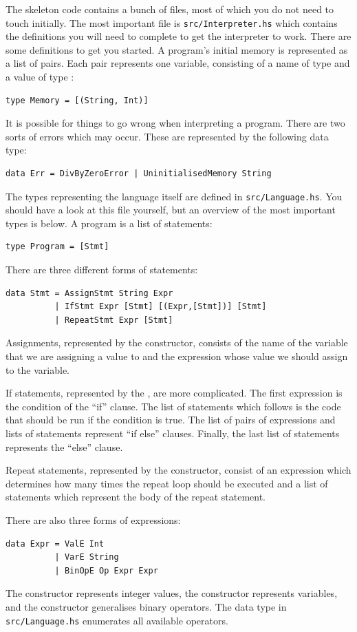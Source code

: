 The skeleton code contains a bunch of files, most of which you do not need to touch initially. The most important file is \texttt{\small src/Interpreter.hs} which contains the definitions you will need to complete to get the interpreter to work. There are some definitions to get you started. A program's initial memory is represented as a list of pairs. Each pair represents one variable, consisting of a name of type  and a value of type :
\begin{verbatim}
type Memory = [(String, Int)]
\end{verbatim}
It is possible for things to go wrong when interpreting a program. There are two sorts of errors which may occur. These are represented by the following data type:
\begin{verbatim}
data Err = DivByZeroError | UninitialisedMemory String
\end{verbatim}
The types representing the language itself are defined in \texttt{\small src/Language.hs}. You should have a look at this file yourself, but an overview of the most important types is below. A program is a list of statements:
\begin{verbatim}
type Program = [Stmt]
\end{verbatim}
There are three different forms of statements: 
\begin{verbatim}
data Stmt = AssignStmt String Expr
          | IfStmt Expr [Stmt] [(Expr,[Stmt])] [Stmt]
          | RepeatStmt Expr [Stmt]
\end{verbatim}
Assignments, represented by the  constructor, consists of the name of the variable that we are assigning a value to and the expression whose value we should assign to the variable. 

If statements, represented by the , are more complicated. The first expression is the condition of the ``if'' clause. The list of statements which follows is the code that should be run if the condition is true. The list of pairs of expressions and lists of statements represent ``if else'' clauses. Finally, the last list of statements represents the ``else'' clause.

Repeat statements, represented by the  constructor, consist of an expression which determines how many times the repeat loop should be executed and a list of statements which represent the body of the repeat statement.

There are also three forms of expressions:
\begin{verbatim}
data Expr = ValE Int
          | VarE String
          | BinOpE Op Expr Expr
\end{verbatim}
The  constructor represents integer values, the  constructor represents variables, and the  constructor generalises binary operators. The  data type in \texttt{\small src/Language.hs} enumerates all available operators.

